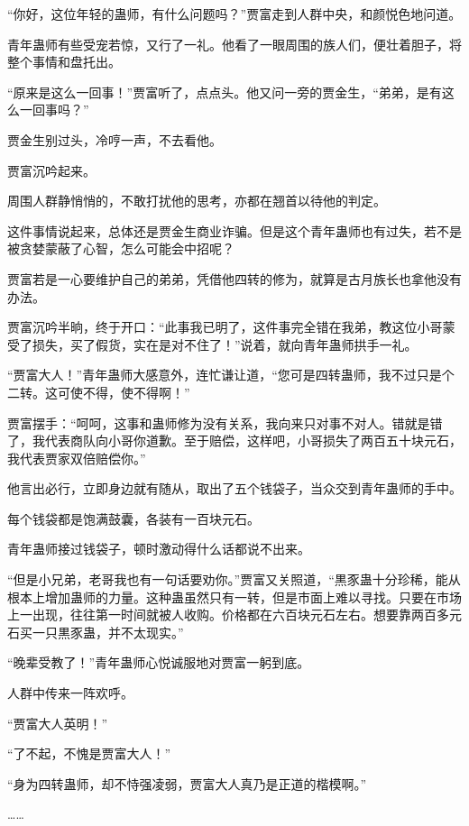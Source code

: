 
\begin{this_body}

“你好，这位年轻的蛊师，有什么问题吗？”贾富走到人群中央，和颜悦色地问道。

青年蛊师有些受宠若惊，又行了一礼。他看了一眼周围的族人们，便壮着胆子，将整个事情和盘托出。

“原来是这么一回事！”贾富听了，点点头。他又问一旁的贾金生，“弟弟，是有这么一回事吗？”

贾金生别过头，冷哼一声，不去看他。

贾富沉吟起来。

周围人群静悄悄的，不敢打扰他的思考，亦都在翘首以待他的判定。

这件事情说起来，总体还是贾金生商业诈骗。但是这个青年蛊师也有过失，若不是被贪婪蒙蔽了心智，怎么可能会中招呢？

贾富若是一心要维护自己的弟弟，凭借他四转的修为，就算是古月族长也拿他没有办法。

贾富沉吟半晌，终于开口：“此事我已明了，这件事完全错在我弟，教这位小哥蒙受了损失，买了假货，实在是对不住了！”说着，就向青年蛊师拱手一礼。

“贾富大人！”青年蛊师大感意外，连忙谦让道，“您可是四转蛊师，我不过只是个二转。这可使不得，使不得啊！”

贾富摆手：“呵呵，这事和蛊师修为没有关系，我向来只对事不对人。错就是错了，我代表商队向小哥你道歉。至于赔偿，这样吧，小哥损失了两百五十块元石，我代表贾家双倍赔偿你。”

他言出必行，立即身边就有随从，取出了五个钱袋子，当众交到青年蛊师的手中。

每个钱袋都是饱满鼓囊，各装有一百块元石。

青年蛊师接过钱袋子，顿时激动得什么话都说不出来。

“但是小兄弟，老哥我也有一句话要劝你。”贾富又关照道，“黒豕蛊十分珍稀，能从根本上增加蛊师的力量。这种蛊虽然只有一转，但是市面上难以寻找。只要在市场上一出现，往往第一时间就被人收购。价格都在六百块元石左右。想要靠两百多元石买一只黒豕蛊，并不太现实。”

“晚辈受教了！”青年蛊师心悦诚服地对贾富一躬到底。

人群中传来一阵欢呼。

“贾富大人英明！”

“了不起，不愧是贾富大人！”

“身为四转蛊师，却不恃强凌弱，贾富大人真乃是正道的楷模啊。”

……


\end{this_body}

